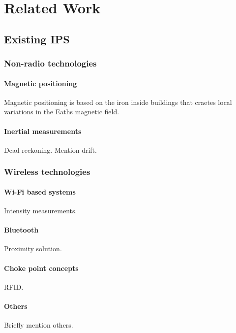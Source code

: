 \section{Related Work}
\subsection{Existing IPS}
\subsubsection{Non-radio technologies}
\paragraph{Magnetic positioning}
Magnetic positioning is based on the iron inside buildings that craetes local variations in the Eaths magnetic field.

\paragraph{Inertial measurements}
Dead reckoning. Mention drift.

\subsubsection{Wireless technologies}
\paragraph{Wi-Fi based systems}
Intensity measurements.

\paragraph{Bluetooth}
Proximity solution.

\paragraph{Choke point concepts}
RFID.

\paragraph{Others}
Briefly mention others.